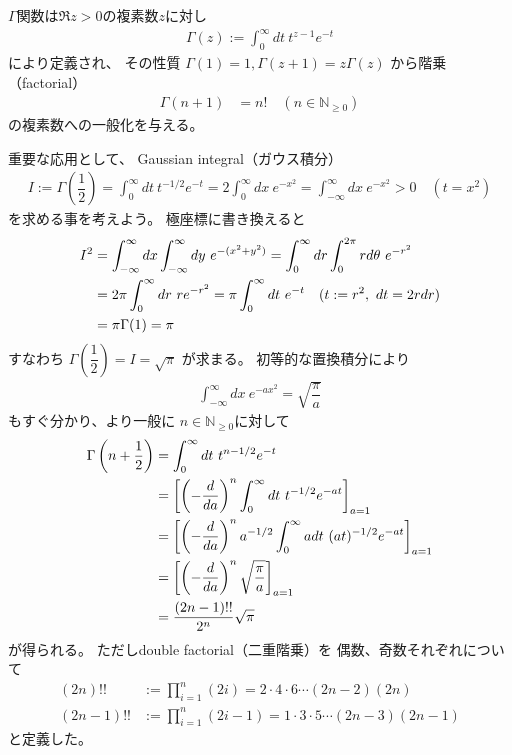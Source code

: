 $\Gamma$関数は$\Re z > 0$の複素数$z$に対し
\begin{align}
    \Gamma(z)
    := \int_0^\infty dt\ t^{z-1} e^{-t}
\end{align}
により定義され、
その性質
$\Gamma(1) = 1, \Gamma(z+1) = z\Gamma(z)$
から階乗（factorial）
\begin{align}
    \Gamma(n+1) &= n!
    \quad
    (n \in \mathbb{N}_{\ge0})
\end{align}
の複素数への一般化を与える。

重要な応用として、
Gaussian integral（ガウス積分）
\begin{align}
    I :=
    \Gamma\left(\dfrac{1}{2}\right)
    =
    \int_{0}^{\infty} dt\ t^{-1/2}e^{-t}
    =
    2
    \int_{0}^{\infty} dx\ e^{-x^2}
    =
    \int_{-\infty}^{\infty} dx\ e^{-x^2}
    > 0
    \quad(t=x^2)
\end{align}
を求める事を考えよう。
極座標に書き換えると
\begin{align}
    I^2 &=
    \int_{-\infty}^{\infty} dx
    \int_{-\infty}^{\infty} dy
    \ 
        e^{-(x^2 + y^2)}
=
    \int_0^{\infty} dr
    \int_0^{2\pi} r d\theta
    \ 
        e^{-r^2}
\notag\\&=
    2 \pi
    \int_0^{\infty} dr
    \ r 
        e^{-r^2}
=
    \pi
    \int_0^{\infty} dt\ e^{-t}
    \quad(t:=r^2,\ dt = 2 r dr)
\notag\\&=
    \pi\Gamma(1)
    = \pi
\end{align}
すなわち
$\Gamma\left(\dfrac{1}{2}\right)
= I = \sqrt{\pi}$
が求まる。
初等的な置換積分により
\begin{align}
    \int_{-\infty}^{\infty} dx\ e^{-ax^2}
    =
    \sqrt{
        \dfrac{\pi}{a}
    }
\end{align}
もすぐ分かり、より一般に
$n \in \mathbb{N}_{\ge0}$に対して
\begin{align}
    \Gamma\left( n + \dfrac{1}{2} \right)
    &=
    \int_0^\infty dt\ t^{n-1/2} e^{-t}
\notag\\&=
    \left[
        \left(
            -
            \dfrac{d}{da}
        \right)^n
        \int_0^\infty dt\ t^{-1/2} e^{-at}
    \right]_{a=1}
\notag\\&=
    \left[
    \left(
        -
        \dfrac{d}{da}
    \right)^n
        a^{-1/2}
        \int_0^\infty a dt\ (at)^{-1/2} e^{-at}
    \right]_{a=1}
\notag\\&=
    \left[
    \left(
        -
        \dfrac{d}{da}
    \right)^n
    \sqrt{
        \dfrac{\pi}{a}
    }
    \right]_{a=1}
\notag\\&=
    \dfrac{(2n-1)!!}{2^{n}}\sqrt{\pi}
\end{align}
が得られる。
ただしdouble factorial（二重階乗）を
偶数、奇数それぞれについて
\begin{subequations}
\begin{align}
    (2n)!!
    &:=
    \prod_{i=1}^n (2i)
    =2\cdot4\cdot6\cdots(2n-2)(2n)
\\
    (2n-1)!!
    &:=
    \prod_{i=1}^n (2i-1)
    =
    1\cdot3\cdot5\cdots(2n-3)(2n-1)
\end{align}
\end{subequations}
と定義した。

